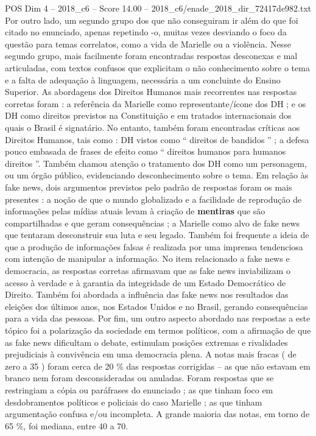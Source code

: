 \begin{textsample}{POS Dim 4 – 2018\_c6 – Score 14.00 – 2018\_c6/enade\_2018\_dir\_72417de982.txt}
Por outro lado, um segundo grupo dos que não conseguiram ir além do que foi citado no enunciado, apenas repetindo -o, muitas vezes desviando o foco da questão para temas correlatos, como a vida de Marielle ou a violência.
Nesse segundo grupo, mais facilmente foram encontradas respostas desconexas e mal articuladas, com textos confusos que explicitam o não conhecimento sobre o tema e a falta de adequação à linguagem, necessária a um concluinte do Ensino Superior.
As abordagens dos Direitos Humanos mais recorrentes nas respostas corretas foram : a referência da Marielle como representante/ícone dos DH ; e os DH como direitos previstos na Constituição e em tratados internacionais dos quais o Brasil é signatário.
No entanto, também foram encontradas críticas aos Direitos Humanos, tais como : DH vistos como “ direitos de bandidos ” ; a defesa pouco embasada de frases de efeito como “ direitos humanos para humanos direitos ”.
Também chamou atenção o tratamento dos DH como um personagem, ou um órgão público, evidenciando desconhecimento sobre o tema.
Em relação às fake news, dois argumentos previstos pelo padrão de respostas foram os mais presentes : a noção de que o mundo globalizado e a facilidade de reprodução de informações pelas mídias atuais levam à criação de \textbf{mentiras} que são compartilhadas e que geram consequências ; a Marielle como alvo de fake news que tentaram desconstruir sua luta e seu legado.
Também foi frequente a ideia de que a produção de informações falsas é realizada por uma imprensa tendenciosa com intenção de manipular a informação.
No item relacionado a fake news e democracia, as respostas corretas afirmavam que as fake news inviabilizam o acesso à verdade e à garantia da integridade de um Estado Democrático de Direito.
Também foi abordada a influência das fake news nos resultados das eleições dos últimos anos, nos Estados Unidos e no Brasil, gerando consequências para a vida das pessoas.
Por fim, um outro aspecto abordado nas respostas a este tópico foi a polarização da sociedade em termos políticos, com a afirmação de que as fake news dificultam o debate, estimulam posições extremas e rivalidades prejudiciais à convivência em uma democracia plena.
A notas mais fracas ( de zero a 35 ) foram cerca de 20 \% das respostas corrigidas – as que não estavam em branco nem foram desconsideradas ou anuladas.
Foram respostas que se restringiam a cópia ou paráfrases do enunciado ; as que tinham foco em desdobramentos políticos e policiais do caso Marielle ; as que tinham argumentação confusa e/ou incompleta.
A grande maioria das notas, em torno de 65 \%, foi mediana, entre 40 a 70.

\end{textsample}
